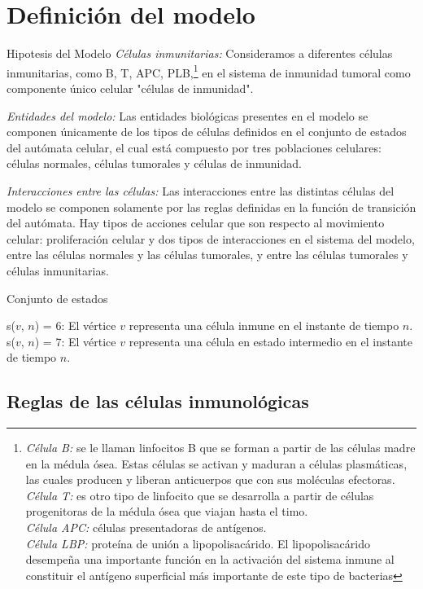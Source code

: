 \chapter{Definici\'on del modelo}\label{chapter:proposal}

Hipotesis del Modelo
{{\it C\'elulas inmunitarias: }} Consideramos a diferentes c\'elulas inmunitarias, como B, T, APC, PLB,\footnote{{\it C\'elula B:} se le llaman linfocitos B que se forman a partir de las c\'elulas madre en la m\'edula \'osea. Estas c\'elulas se activan y maduran a c\'elulas plasm\'aticas, las cuales producen y liberan anticuerpos que con sus mol\'eculas efectoras.\\ {\it C\'elula T:} es otro tipo de linfocito que se desarrolla a partir de c\'elulas progenitoras de la m\'edula \'osea que viajan hasta el timo.\\ {\it C\'elula APC:} c\'elulas presentadoras de ant\'igenos.\\ {\it C\'elula LBP:} prote\'ina de uni\'on a lipopolisac\'arido. El lipopolisac\'arido desempe\~na una importante funci\'on en la activaci\'on del sistema inmune al constituir el ant\'igeno superficial m\'as importante de este tipo de bacterias} en el sistema de inmunidad tumoral como componente \'unico celular "c\'elulas de inmunidad".

{\it Entidades del modelo:} Las entidades biol\'ogicas presentes en el modelo se componen \'unicamente de los tipos de c\'elulas definidos en el conjunto de estados del aut\'omata celular, el cual est\'a compuesto por tres poblaciones celulares: c\'elulas normales, c\'elulas tumorales y c\'elulas de inmunidad.

{\it Interacciones entre las c\'elulas:} Las interacciones entre las distintas c\'elulas del modelo se componen solamente por las reglas definidas en la funci\'on de transici\'on del aut\'omata. Hay tipos de acciones celular que son respecto al movimiento celular: proliferaci\'on celular y dos tipos de interacciones en el sistema del modelo, entre las c\'elulas normales y las c\'elulas tumorales, y entre las c\'elulas tumorales y c\'elulas inmunitarias.


Conjunto de estados

s($v$, $n$) = 6: El v\'ertice $v$ representa una c\'elula inmune en el instante de tiempo $n$.
s($v$, $n$) = 7: El v\'ertice $v$ representa una c\'elula en estado intermedio en el instante de tiempo $n$.

\section{Reglas de las c\'elulas inmunológicas}

